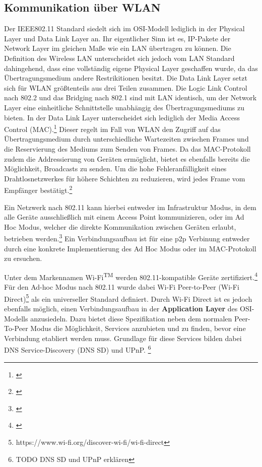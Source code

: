     \subsection{Kommunikation über WLAN}
        Der IEEE802.11 Standard siedelt sich im OSI-Modell lediglich in der Physical Layer und Data Link Layer an. Ihr eigentlicher Sinn ist es,
        IP-Pakete der Network Layer im gleichen Maße wie ein LAN übertragen zu können.
        Die Definition des Wireless LAN unterscheidet sich jedoch vom LAN Standard dahingehend, dass eine vollständig eigene Physical Layer geschaffen wurde,
        da das Übertragungsmedium andere Restrikitionen besitzt. Die Data Link Layer setzt sich für WLAN größtenteils aus drei Teilen zusammen.
        Die Logic Link Control nach 802.2 und das Bridging nach 802.1 sind mit LAN identisch, um der Network Layer eine einheitliche Schnittstelle unabhängig des Übertragungsmediums zu bieten.
        In der Data Link Layer unterscheidet sich lediglich der Media Access Control (MAC).\footnote{\cite[S.311]{Sauter}}
        Dieser regelt im Fall von WLAN den Zugriff auf das Übertragungsmedium durch unterschiedliche Wartezeiten zwischen Frames und die Reservierung des Mediums zum Senden von Frames.
        Da das MAC-Protokoll zudem die Addressierung von Geräten ermöglicht, bietet es ebenfalls bereits die Möglichkeit, Broadcasts zu senden.
        Um die hohe Fehleranfälligkeit eines Drahtlosnetzwerkes für höhere Schichten zu reduzieren, wird jedes Frame vom Empfänger bestätigt.\footnote{\cite[S.325-327]{Sauter}}
        
        Ein Netzwerk nach 802.11 kann hierbei entweder im Infrastruktur Modus, in dem alle Geräte ausschließlich mit einem Access Point kommunizieren,
        oder im Ad Hoc Modus, welcher die direkte Kommunikation zwischen Geräten erlaubt, betrieben werden.\footnote{\cite[S.82]{Sikora}}
        Ein Verbindungsaufbau ist für eine p2p Verbinung entweder durch eine konkrete Implementierung des Ad Hoc Modus oder
        im MAC-Protokoll zu ersuchen.

        Unter dem Markennamen Wi-Fi\textsuperscript{TM} werden 802.11-kompatible Geräte zertifiziert.\footnote{\cite[S.80]{Sikora}}
        Für den Ad-hoc Modus nach 802.11 wurde dabei Wi-Fi Peer-to-Peer (Wi-Fi Direct)\textregistered\footnote{https://www.wi-fi.org/discover-wi-fi/wi-fi-direct} als ein universeller Standard definiert.
        Durch Wi-Fi Direct ist es jedoch ebenfalls möglich, einen Verbindungsaufbau in der {\bf Application Layer} des OSI-Modells anzusiedeln.
        Dazu bietet diese Spezifikation neben dem normalen Peer-To-Peer Modus die Möglichkeit, Services anzubieten und zu finden, bevor eine Verbindung etabliert werden muss.
        Grundlage für diese Services bilden dabei DNS Service-Discovery (DNS SD) und UPnP. \footnote{TODO DNS SD und UPnP erklären}

